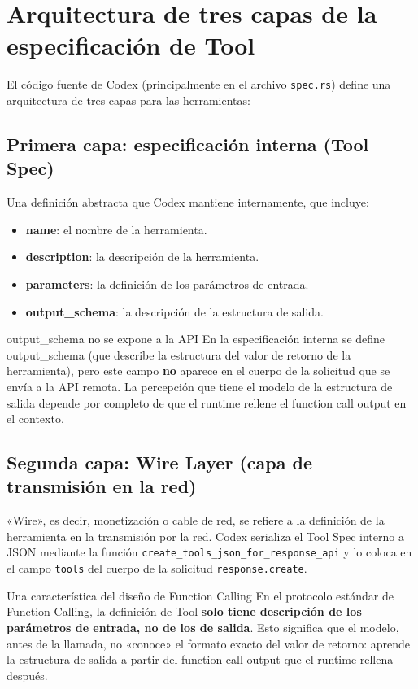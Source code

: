 \section{Arquitectura de tres capas de la especificación de Tool}

El código fuente de Codex (principalmente en el archivo \texttt{spec.rs}) define una arquitectura de tres capas para las herramientas:

\subsection{Primera capa: especificación interna (Tool Spec)}

Una definición abstracta que Codex mantiene internamente, que incluye:
\begin{itemize}
    \item \textbf{name}: el nombre de la herramienta.
    \item \textbf{description}: la descripción de la herramienta.
    \item \textbf{parameters}: la definición de los parámetros de entrada.
    \item \textbf{output\_schema}: la descripción de la estructura de salida.
\end{itemize}

\begin{warningbox}{output\_schema no se expone a la API}
En la especificación interna se define output\_schema (que describe la estructura del valor de retorno de la herramienta), pero este campo \textbf{no} aparece en el cuerpo de la solicitud que se envía a la API remota. La percepción que tiene el modelo de la estructura de salida depende por completo de que el runtime rellene el function call output en el contexto.
\end{warningbox}

\subsection{Segunda capa: Wire Layer (capa de transmisión en la red)}

«Wire», es decir, monetización o cable de red, se refiere a la definición de la herramienta en la transmisión por la red. Codex serializa el Tool Spec interno a JSON mediante la función \texttt{create\_tools\_json\_for\_response\_api} y lo coloca en el campo \texttt{tools} del cuerpo de la solicitud \texttt{response.create}.

\begin{knowledgebox}{Una característica del diseño de Function Calling}
En el protocolo estándar de Function Calling, la definición de Tool \textbf{solo tiene descripción de los parámetros de entrada, no de los de salida}. Esto significa que el modelo, antes de la llamada, no «conoce» el formato exacto del valor de retorno: aprende la estructura de salida a partir del function call output que el runtime rellena después.
\end{knowledgebox}

